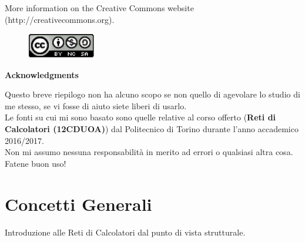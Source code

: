 \documentclass[12pt]{article}
\begin{document}
\noindent More information on the Creative Commons website (http://creativecommons.org).

\begin{figure}[h!]
  \centering
  \includegraphics[width=3cm]{images/license.png}
\end{figure}

{\noindent \Large \textbf{Acknowledgments}\bigskip}

Questo breve riepilogo non ha alcuno scopo se non quello di agevolare lo studio di me stesso, se vi fosse di aiuto siete liberi di usarlo.\\
Le fonti su cui mi sono basato sono quelle relative al corso offerto (\textbf{Reti di Calcolatori (12CDUOA)}) dal Politecnico di Torino durante l'anno accademico 2016/2017.\\
Non mi assumo nessuna responsabilità in merito ad errori o qualsiasi altra cosa. Fatene buon uso!
\newpage

\section{Concetti Generali}\label{subsubsec}
Introduzione alle Reti di Calcolatori dal punto di vista strutturale.
\end{document}

